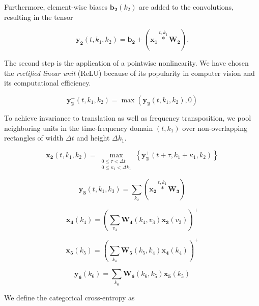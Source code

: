 \documentclass{article}
\begin{document}
Furthermore, element-wise biases $\boldsymbol{b_2}(k_2)$ are added to the convolutions, resulting in the tensor 

\begin{equation}
\boldsymbol{y_2}(t,k_1,k_2) =
\boldsymbol{b_2} + 
(\boldsymbol{x_1}
\overset{t,k_1}{\ast}
\boldsymbol{W_2}).
\end{equation}
 
The second step is the application of a pointwise nonlinearity. We have chosen the \emph{rectified linear unit} (ReLU) because of its popularity in computer vision and its computational efficiency.
 
 \begin{equation}
 \boldsymbol{y_{2}^{+}}(t,k_1,k_2) = \max \left( \boldsymbol{y_2}(t,k_1,k_2), 0\right)
 \end{equation}
 
 To achieve invariance to translation as well as frequency transposition, we pool neighboring units in
 the time-frequency domain $(t,k_1)$ over non-overlapping rectangles of width $\Delta t$ and height $\Delta k_1$.
 
 \begin{equation}
 \boldsymbol{x_2}(t,k_1,k_2) =
 \max_{
\substack{
0 \leq \tau < \Delta t \\
0 \leq \kappa_1 < \Delta k_1}
 } \left\{
 \boldsymbol{y_{2}^{+}}(t + \tau, k_1 + \kappa_1, k_2)
 \right\}
 \end{equation}
 
 \begin{equation}
 \boldsymbol{y_3}(t,k_1,k_3) =
 \sum_{k_2}
 (\boldsymbol{x_2}
 \overset{t,k_1}{\ast}
 \boldsymbol{W_3})
 \end{equation}

\begin{equation}
\boldsymbol{x_4}(k_4) =
\left(
\sum_{v_3}
\boldsymbol{W_4}(k_4, v_3)
\boldsymbol{x_3}(v_3) \right)^{+}
\end{equation}

\begin{equation}
\boldsymbol{x_5}(k_5) =
\left(
\sum_{k_4}
\boldsymbol{W_5}(k_5, k_4)
\boldsymbol{x_4}(k_4)
\right)^{+}
\end{equation}

\begin{equation}
\boldsymbol{y_6}(k_6) =
\sum_{k_6}
\boldsymbol{W_6}(k_6,k_5)
\boldsymbol{x_5}(k_5)
\end{equation}

We define the categorical cross-entropy as
\end{document}
